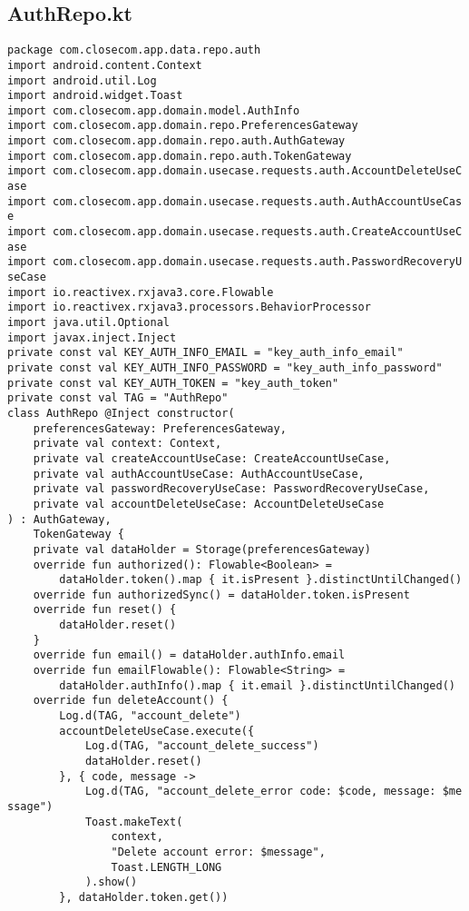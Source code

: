 \documentclass[listing]{espd}
\begin{document}
\subsection{AuthRepo.kt}
\begin{verbatim}
package com.closecom.app.data.repo.auth
import android.content.Context
import android.util.Log
import android.widget.Toast
import com.closecom.app.domain.model.AuthInfo
import com.closecom.app.domain.repo.PreferencesGateway
import com.closecom.app.domain.repo.auth.AuthGateway
import com.closecom.app.domain.repo.auth.TokenGateway
import com.closecom.app.domain.usecase.requests.auth.AccountDeleteUseC
ase
import com.closecom.app.domain.usecase.requests.auth.AuthAccountUseCas
e
import com.closecom.app.domain.usecase.requests.auth.CreateAccountUseC
ase
import com.closecom.app.domain.usecase.requests.auth.PasswordRecoveryU
seCase
import io.reactivex.rxjava3.core.Flowable
import io.reactivex.rxjava3.processors.BehaviorProcessor
import java.util.Optional
import javax.inject.Inject
private const val KEY_AUTH_INFO_EMAIL = "key_auth_info_email"
private const val KEY_AUTH_INFO_PASSWORD = "key_auth_info_password"
private const val KEY_AUTH_TOKEN = "key_auth_token"
private const val TAG = "AuthRepo"
class AuthRepo @Inject constructor(
    preferencesGateway: PreferencesGateway,
    private val context: Context,
    private val createAccountUseCase: CreateAccountUseCase,
    private val authAccountUseCase: AuthAccountUseCase,
    private val passwordRecoveryUseCase: PasswordRecoveryUseCase,
    private val accountDeleteUseCase: AccountDeleteUseCase
) : AuthGateway,
    TokenGateway {
    private val dataHolder = Storage(preferencesGateway)
    override fun authorized(): Flowable<Boolean> =
        dataHolder.token().map { it.isPresent }.distinctUntilChanged()
    override fun authorizedSync() = dataHolder.token.isPresent
    override fun reset() {
        dataHolder.reset()
    }
    override fun email() = dataHolder.authInfo.email
    override fun emailFlowable(): Flowable<String> =
        dataHolder.authInfo().map { it.email }.distinctUntilChanged()
    override fun deleteAccount() {
        Log.d(TAG, "account_delete")
        accountDeleteUseCase.execute({
            Log.d(TAG, "account_delete_success")
            dataHolder.reset()
        }, { code, message ->
            Log.d(TAG, "account_delete_error code: $code, message: $me
ssage")
            Toast.makeText(
                context,
                "Delete account error: $message",
                Toast.LENGTH_LONG
            ).show()
        }, dataHolder.token.get())

\end{verbatim}
\end{document}

